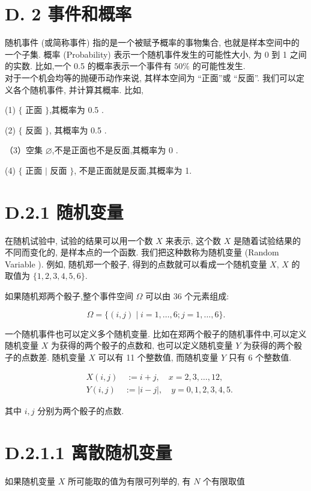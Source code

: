\documentclass[10pt]{article}
\begin{document}
\section*{D. 2 事件和概率}
随机事件 (或简称事件) 指的是一个被赋予概率的事物集合, 也就是样本空间中的一个子集. 概率 (Probability) 表示一个随机事件发生的可能性大小, 为 0 到 1 之间的实数. 比如,一个 0.5 的概率表示一个事件有 $50 \%$ 的可能性发生.\\
对于一个机会均等的抛硬币动作来说, 其样本空间为 “正面”或 “反面”. 我们可以定义各个随机事件, 并计算其概率. 比如,

(1) $\{$ 正面 $\}$,其概率为 0.5 .

(2) $\{$ 反面 $\}$, 其概率为 0.5 .

（3）空集 $\varnothing$,不是正面也不是反面,其概率为 0 .

(4) $\{$ 正面 $\mid$ 反面 $\}$, 不是正面就是反面,其概率为 1.

\section*{D.2.1 随机变量}
在随机试验中, 试验的结果可以用一个数 $X$ 来表示, 这个数 $X$ 是随着试验结果的不同而变化的, 是样本点的一个函数. 我们把这种数称为随机变量 (Random Variable ). 例如, 随机郑一个骰子, 得到的点数就可以看成一个随机变量 $X$, $X$ 的取值为 $\{1,2,3,4,5,6\}$.

如果随机郑两个骰子,整个事件空间 $\Omega$ 可以由 36 个元素组成:


\begin{equation*}
\Omega=\{(i, j) \mid i=1, \ldots, 6 ; j=1, \ldots, 6\} . \tag{D.1}
\end{equation*}


一个随机事件也可以定义多个随机变量. 比如在郑两个骰子的随机事件中,可以定义随机变量 $X$ 为获得的两个骰子的点数和, 也可以定义随机变量 $Y$ 为获得的两个骰子的点数差. 随机变量 $X$ 可以有 11 个整数值, 而随机变量 $Y$ 只有 6 个整数值.


\begin{align*}
& X(i, j) \quad:=i+j, \quad x=2,3, \ldots, 12,  \tag{D.2}\\
& Y(i, j) \quad:=|i-j|, \quad y=0,1,2,3,4,5 . \tag{D.3}
\end{align*}


其中 $i, j$ 分别为两个骰子的点数.

\section*{D.2.1.1 离散随机变量}
如果随机变量 $X$ 所可能取的值为有限可列举的, 有 $N$ 个有限取值
\end{document}
